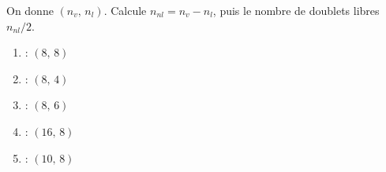 \documentclass[11pt,a4paper]{article}
\begin{document}
\begin{exo}
On donne $(n_{v},\,n_l)$. Calcule $n_{nl} = n_v - n_l$, puis le nombre de doublets libres $n_{nl}/2$.
\begin{enumerate}[label=\alph*)]
  \item {} : $(8,\,8)$
  \item {} : $(8,\,4)$
  \item {} : $(8,\,6)$
  \item {} : $(16,\,8)$
  \item {} : $(10,\,8)$
\end{enumerate}
\end{exo}
\end{document}
